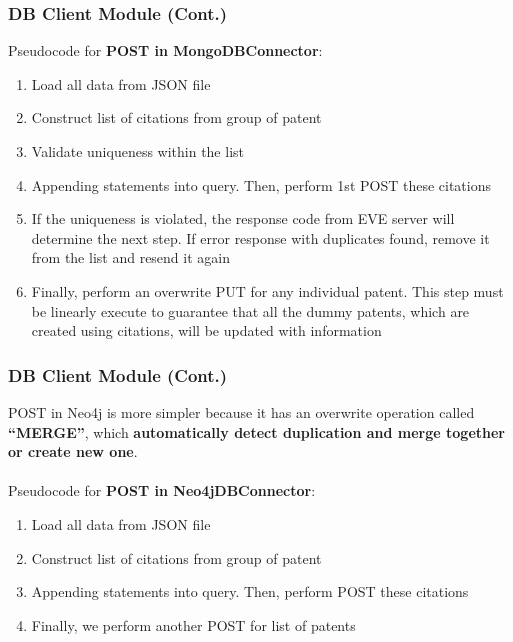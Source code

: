 \documentclass{beamer}
\begin{document}
\begin{frame}
\frametitle{DB Client Module (Cont.)}
Pseudocode for \textbf{POST in MongoDBConnector}:
\begin{enumerate}
\item Load all data from JSON file
\item Construct list of citations from group of patent
\item Validate uniqueness within the list
\item Appending statements into query. Then, perform 1st POST these citations
\item If the uniqueness is violated, the response code from EVE server will determine the next step. If error response with duplicates found, remove it from the list and resend it again
\item Finally, perform an overwrite PUT for any individual patent. This step must be linearly execute to guarantee that all the dummy patents, which are created using citations, will be updated with information
\end{enumerate}
\end{frame}

\begin{frame}
\frametitle{DB Client Module (Cont.)}
POST in Neo4j is more simpler because it has an overwrite operation called \textbf{``MERGE''}, which \textbf{automatically detect duplication and merge together or create new one}.\\~\\
Pseudocode for \textbf{POST in Neo4jDBConnector}:
\begin{enumerate}
\item Load all data from JSON file
\item Construct list of citations from group of patent
\item Appending statements into query. Then, perform POST these citations
\item Finally, we perform another POST for list of patents
\end{enumerate}
\end{frame}
\end{document}
